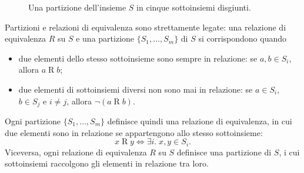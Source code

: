 \documentclass[a4paper, 11pt, oneside]{book}
\theoremstyle{formale}
\begin{document}
    \begin{figure}[H]
        \centering
        \caption{Una partizione dell'insieme $S$ in cinque sottoinsiemi disgiunti.}
        \label{fig:partizione}
    \end{figure}

    Partizioni e relazioni di equivalenza sono strettamente legate: una relazione di
    equivalenza $R$ su $S$ e una partizione $\{S_1, \dots, S_m\}$ di $S$ si
    corrispondono quando
    \begin{itemize}
        \item due elementi dello stesso sottoinsieme sono sempre in relazione: se
            $a, b \in S_i$, allora $a \mathrel{R} b$;
        \item due elementi di sottoinsiemi diversi non sono mai in relazione: se
            $a \in S_i$, $b \in S_j$ e $i \neq j$, allora $\lnot (a \mathrel{R} b)$.
    \end{itemize}
    Ogni partizione $\{S_1, \dots, S_m\}$ definisce quindi una relazione di equivalenza,
    in cui due elementi sono in relazione se appartengono allo stesso sottoinsieme:
    \begin{equation*}
        x \mathrel{R} y \iff \exists i.\; x, y \in S_i.
    \end{equation*}
    Viceversa, ogni relazione di equivalenza $R$ su $S$ definisce una partizione di $S$,
    i cui sottoinsiemi raccolgono gli elementi in relazione tra loro.
\end{document}
